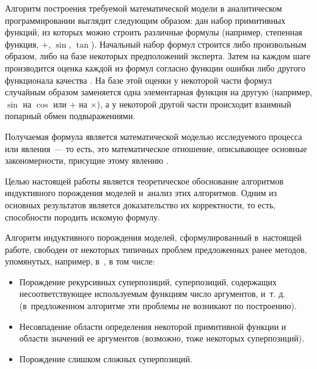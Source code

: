\documentclass[12pt,a4paper]{article}
\begin{document}
Алгоритм построения требуемой математической модели в аналитическом
программировании выглядит следующим образом:
дан набор примитивных функций, из которых можно строить различные формулы
(например, степенная функция, $+$, $\sin$, $\tan$). Начальный набор формул
строится либо произвольным образом, либо на базе некоторых предположений
эксперта. Затем на каждом шаге производится оценка каждой из формул согласно
функции ошибки либо другого функционала качества \cite{Tirsin2005}. На базе
этой оценки у некоторой части формул случайным образом заменяется одна
элементарная функция на другую (например, $\sin$ на $\cos$ или $+$ на
$\times$), а у некоторой другой части происходит взаимный попарный обмен
подвыражениями.

Получаемая формула является математической моделью исследуемого процесса или
явления~--- то есть, это математическое отношение, описывающее основные
закономерности, присущие этому явлению \cite{Pavlovsky2000}.


Целью настоящей работы является теоретическое обоснование алгоритмов
индуктивного порождения моделей и~анализ этих алгоритмов. Одним из основных
результатов является доказательство их корректности, то есть, способности
породить искомую формулу.

Алгоритм индуктивного порождения моделей, сформулированный в~настоящей работе,
свободен от некоторых типичных проблем предложенных ранее методов, упомянутых,
например, в~\cite{Zelinka2008}, в том числе:
\begin{itemize}
  \item Порождение рекурсивных суперпозиций, суперпозиций, содержащих
	несоответствующее используемым функциям число аргументов, и~т. д.
	(в~предложенном алгоритме эти проблемы не возникают по построению).
  \item Несовпадение области определения некоторой примитивной функции и области
	значений ее аргументов (возможно, тоже некоторых суперпозиций).
  \item Порождение слишком сложных суперпозиций.
\end{itemize}
\end{document}
